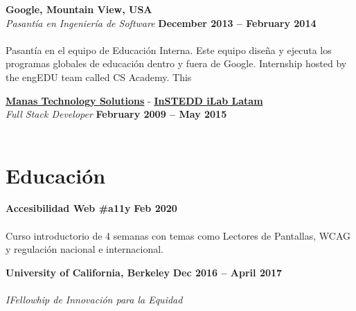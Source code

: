 \documentclass[margin,line]{resume}
\begin{document}
\begin{resume}
\begin{itemize}
\end{itemize}





\newpage



\textbf{Google, Mountain View, USA}\vspace{2mm}\\\vspace{1mm}
\textsl{Pasantía en Ingeniería de Software} \hfill \textbf{December 2013 -- February 2014}\vspace{-3mm}\\\vspace{-1mm}
\\
Pasantía en el equipo de Educación Interna. Este equipo diseña y ejecuta los programas globales de educación dentro y fuera de Google.
Internship hosted by the engEDU team called CS Academy. This 

\textbf{\href{http://www.manas.com.ar/}{Manas Technology Solutions}} - 
\textbf{\href{http://www.instedd.org/}{InSTEDD iLab Latam}}\vspace{2mm}\\\vspace{1mm}
\textsl{Full Stack Developer} \hfill \textbf{February 2009 -- May 2015}\vspace{-3mm}\\\vspace{-1mm}
\\




\section{\mysidestyle Educación}

\textbf{Accesibilidad Web  \#a11y} \hfill \textbf{Feb 2020}\vspace{-3mm}\\\vspace{-1mm}
\\
Curso introductorio de 4 semanas con temas como Lectores de Pantallas, WCAG y regulación nacional e internacional.




\textbf{University of California, Berkeley} \hfill \textbf{Dec 2016 -- April 2017}\vspace{-3mm}\\\vspace{-1mm}
\\
\textsl{IFellowhip de Innovación para la Equidad} 



\end{resume}
\end{document}
